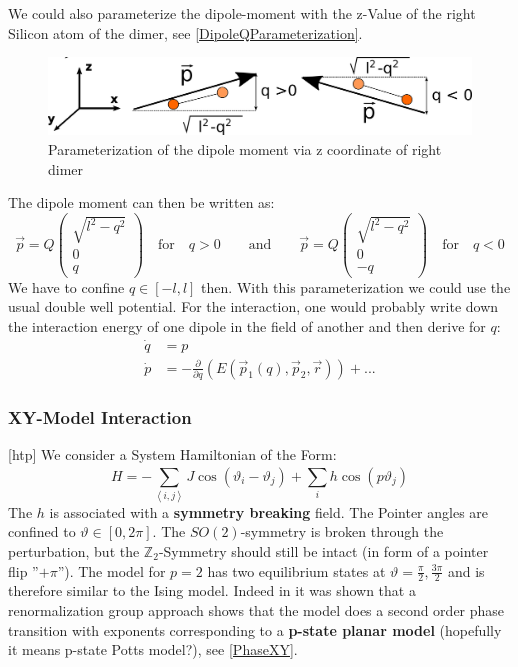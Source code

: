 	We could also parameterize the dipole-moment with the z-Value of the right Silicon atom of the dimer, see \autoref{DipoleQParameterization}.
	\begin{figure}[htp]
		\centering
		\includegraphics[width=0.8\linewidth]{graphics/DimerQParameterization.png}
		\caption{Parameterization of the dipole moment via z coordinate of right dimer}
		\label{DipoleQParameterization}
	\end{figure}
	The dipole moment can then be written as:
	\begin{equation}
		\vec{p} =	Q\left( \begin{array}{c}
			\sqrt{l^2 -  q^2} \\
			0 \\
			q
		\end{array} \right) \quad \text{for} \quad q > 0 \qquad \text{and} \qquad \vec{p} =  Q	\left(\begin{array}{c}
			\sqrt{l^2 -  q^2} \\
			0 \\
			-q
		\end{array} \right) \quad \text{for} \quad q < 0
	\end{equation}
	We have to confine $q \in \left[-l, l\right]$ then. With this parameterization we could use the usual double well potential. For the interaction, one would probably write down the interaction energy of one dipole in the field of another and then derive for $q$:
	\begin{align}
		\dot{q} &=	p \\
		\dot{p} &=	- \frac{\partial}{\partial q} \left( E(\vec{p}_1(q), \vec{p}_2, \vec{r}) \right) + ...
	\end{align}
	\subsubsection{XY-Model Interaction}[htp]
	We consider a System Hamiltonian of the Form:
	\begin{equation}
		H =	 - \sum_{\left \langle i, j \right \rangle}^{} J \cos \left(\vartheta_i - \vartheta_j \right)  + \sum_i h \cos \left(p	\vartheta_j\right)
	\end{equation}
	The $h$ is associated with a \textbf{symmetry breaking} field. The Pointer angles are confined to $\vartheta \in \left[0, 2\pi \right]$. The $SO(2)$-symmetry is broken through the perturbation, but the $\mathbb{Z}_2$-Symmetry should still be intact (in form of a pointer flip ''$ +\pi$''). The model for $p=2$ has two equilibrium states at $\vartheta =	\frac{\pi}{2}, \frac{3 \pi}{2}$ and is therefore similar to the Ising model. Indeed in \cite{jose1977renormalization} it was shown that a renormalization group approach shows that the model does a second order phase transition with exponents corresponding to a \textbf{p-state planar model} (hopefully it means p-state Potts model?), see \autoref{PhaseXY}.
	
